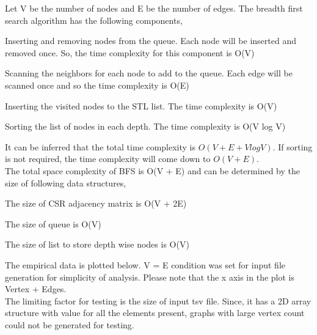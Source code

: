 \documentclass[11pt,a4paper,oneside]{article}
\begin{document}
    Let V be the number of nodes and E be the number of edges. The breadth first search algorithm has the following components,
    \begin{list}{*}{}
    	\item Inserting and removing nodes from the queue. Each node will be inserted and removed once. So, the time complexity for this component is O(V)
    	\item Scanning the neighbors for each node to add to the queue. Each edge will be scanned once and so the time complexity is O(E) 
    	\item Inserting the visited nodes to the STL list. The time complexity is O(V)
    	\item Sorting the list of nodes in each depth. The time complexity is O(V log V) 
    \end{list}
    It can be inferred that the total time complexity is $O(V + E + V log V)$. If sorting is not required, the time complexity will come down to $O(V+E)$. \\
    \newline
    The total space complexity of BFS is O(V + E) and can be determined by the size of following data structures,
    
    \begin{list}{*}{}
    	\item The size of CSR adjacency matrix is O(V + 2E)
    	\item The size of queue is O(V)
    	\item The size of list to store depth wise nodes is O(V)
    \end{list}

    The empirical data is plotted below. V = E condition was set for input file generation for simplicity of analysis. Please note that the x axis in the plot is Vertex + Edges. \\
        
    The limiting factor for testing is the size of input tsv file. Since, it has a 2D array structure with value for all the elements present, graphs with large vertex count could not be generated for testing. 
\end{document}
